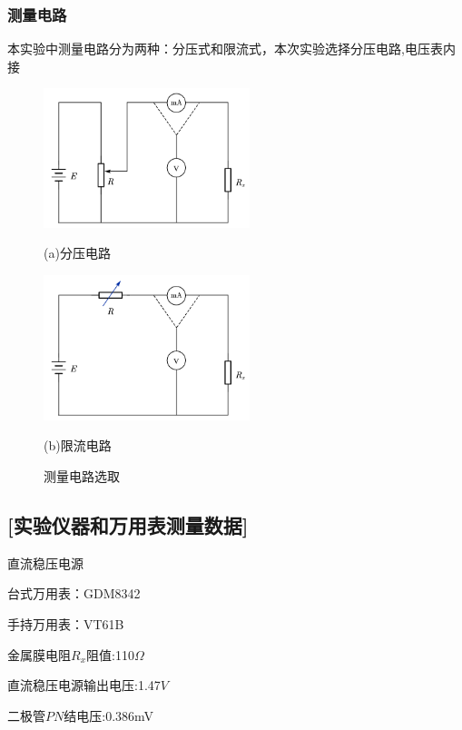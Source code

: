 \documentclass[12pt,a4paper,UTF8]{ctexart}
\begin{document}
	\subsubsection*{测量电路}
	\par 本实验中测量电路分为两种：分压式和限流式，本次实验选择分压电路,电压表内接
		\begin{figure}[htbp]
		\centering
		\begin{minipage}[t]{0.48\textwidth}
			\centering
			\includegraphics[width=6cm]{分压电路}
			\caption*{(a)分压电路}
		\end{minipage}
		\begin{minipage}[t]{0.48\textwidth}
			\centering
			\includegraphics[width=6cm]{限流电路}
			\caption*{(b)限流电路}
		\end{minipage}
	\caption{测量电路选取}
	\end{figure}
	
	

	
	\subsection*{[实验仪器和万用表测量数据]}
	\par 直流稳压电源
	\par 台式万用表：GDM8342
	\par 手持万用表：VT61B
	\par 金属膜电阻$R_x$阻值:110$\Omega$
	\par 直流稳压电源输出电压:1.47$V$
	\par 二极管$PN$结电压:0.386mV

	
	
	
	
	
	
\end{document}
